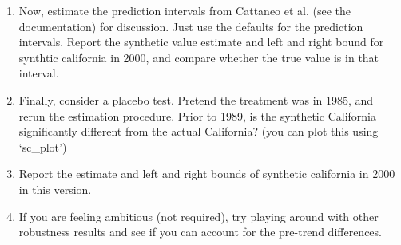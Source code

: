 \documentclass[11pt, a4paper]{article}
\begin{document}
\begin{enumerate}
\begin{enumerate}
    \item Now, estimate the prediction intervals from Cattaneo et al. (see the documentation) for discussion. Just use the defaults for the prediction intervals. Report the synthetic value estimate and  left and right bound for synthtic california in 2000, and compare whether the true value is in that interval.
    \item Finally, consider a placebo test. Pretend the treatment was in 1985, and rerun the estimation procedure. Prior to 1989, is the synthetic California significantly different from the actual California?  (you can plot this using `sc\_plot')
    \item Report the estimate and  left and right bounds of synthetic california in 2000 in this version. 
    \item If you are feeling ambitious (not required), try playing around with other robustness results and see if you can account for the pre-trend differences.
    \end{enumerate}
\end{enumerate}
\end{document}
